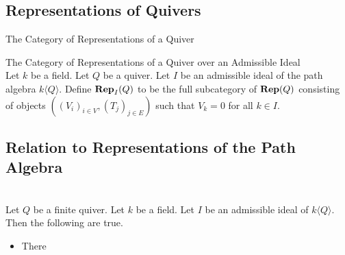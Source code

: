 \documentclass[a4paper]{article}
\begin{document}
\subsection{Representations of Quivers}
\begin{defn}{The Category of Representations of a Quiver}{}
\end{defn}

\begin{defn}{The Category of Representations of a Quiver over an Admissible Ideal}{}\\
Let $k$ be a field. Let $Q$ be a quiver. Let $I$ be an admissible ideal of the path algebra $k\langle Q\rangle$. Define $\bold{Rep}_I(Q)$ to be the full subcategory of $\bold{Rep}(Q)$ consisting of objects $((V_i)_{i\in V},(T_j)_{j\in E})$ such that $V_k=0$ for all $k\in I$. 
\end{defn}

\subsection{Relation to Representations of the Path Algebra}
\begin{prp}{}{}\\
Let $Q$ be a finite quiver. Let $k$ be a field. Let $I$ be an admissible ideal of $k\langle Q\rangle$. Then the following are true. 
\begin{itemize}
\item There 
\end{itemize}
\end{prp}
\end{document}

